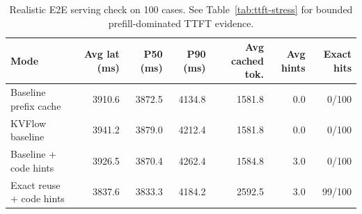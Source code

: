 \begin{table}[t]
\centering
\caption{Realistic E2E serving check on 100 cases. See Table~\ref{tab:ttft-stress} for bounded prefill-dominated TTFT evidence.}
\label{tab:prefetch}
\begin{tabular}{lrrrrrr}
\toprule
Mode & Avg lat (ms) & P50 (ms) & P90 (ms) & Avg cached tok. & Avg hints & Exact hits \\
\midrule
Baseline prefix cache & 3910.6 & 3872.5 & 4134.8 & 1581.8 & 0.0 & 0/100 \\
KVFlow baseline & 3941.2 & 3879.0 & 4212.4 & 1581.8 & 0.0 & 0/100 \\
Baseline + code hints & 3926.5 & 3870.4 & 4262.4 & 1584.8 & 3.0 & 0/100 \\
Exact reuse + code hints & 3837.6 & 3833.3 & 4184.2 & 2592.5 & 3.0 & 99/100 \\
\bottomrule
\end{tabular}
\end{table}
